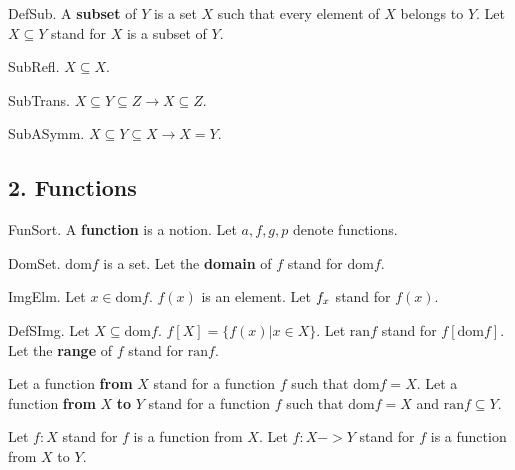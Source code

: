 \begin{definition} DefSub.  
A {\bf subset} of $Y$ is a set $X$ such that
every element of $X$ belongs to $Y$.
Let $X \subseteq Y$ stand for $X$ is a subset of $Y$.
\end{definition}

\begin{lemma} SubRefl.
$X \subseteq X$.
\end{lemma}

\begin{lemma} SubTrans.
$X \subseteq Y \subseteq Z  \rightarrow  X \subseteq Z$.
\end{lemma}

\begin{axiom} SubASymm.
$X \subseteq Y \subseteq X  \rightarrow  X = Y$.
\end{axiom}


\subsection{2. Functions}


\begin{signature} FunSort.
A {\bf function} is a notion.
Let $a,f,g,p$ denote functions.
\end{signature}

\begin{signature} DomSet.
$\text{dom} f$ is a set.
Let the {\bf domain} of $f$ stand for $\text{dom} f$.
\end{signature}

\begin{signature} ImgElm.
Let $x \in \text{dom} f$. $f(x)$ is an element.
Let ${f}_{x}$ stand for $f(x)$.
\end{signature}

\begin{definition} DefSImg. 
Let $X \subseteq \text{dom} f$. $f[X] = \{ f(x) | x \in X \}$.
Let $\text{ran} f$ stand for $f[\text{dom} f]$.
Let the {\bf range} of $f$ stand for $\text{ran} f$.

Let a function {\bf from} $X$ stand for a function $f$
such that $\text{dom} f = X$.
Let a function {\bf from} $X$ {\bf to} $Y$ stand 
for a function $f$ such that $\text{dom} f = X$
and $\text{ran} f \subseteq Y$.

Let $f : X$ stand for $f$ is a function from $X$.
Let $f : X -> Y$ stand for $f$ is a function from $X$ to $Y$.
\end{definition}

